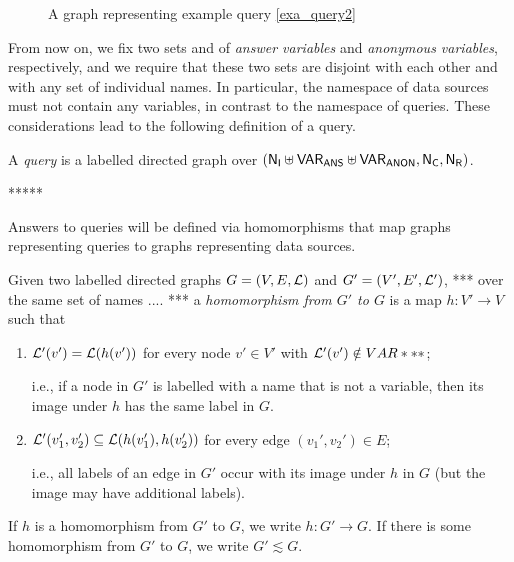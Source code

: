 \begin{figure}
  \caption{A graph representing example query \ref{exa_query2}}
  \label{fig:graph_for_exa_query2}
\end{figure}

From now on, we fix two sets \VARANS and \VARANON
of \emph{answer variables} and \emph{anonymous variables}, respectively,
and we require that these two sets are disjoint with each other
and with any set \NI of individual names.
In particular, the namespace of data sources must not contain any variables,
in contrast to the namespace of queries.
These considerations lead to the following definition of a query.

\begin{definition}
  A \emph{query} is a labelled directed graph
  over $(\mathsf{N}_\mathsf{I} \uplus \mathsf{VAR}_\mathsf{ANS} \uplus \mathsf{VAR}_\mathsf{ANON}, \mathsf{N}_\mathsf{C}, \mathsf{N}_\mathsf{R})$.
\end{definition}



*****


Answers to queries will be defined via homomorphisms that map graphs representing queries
to graphs representing data sources.
%
\begin{definition}
  Given two labelled directed graphs $G = (V,E,\mathcal{L})$ and $G' = (V',E',\mathcal{L}')$,
  *** over the same set of names .... ***
  a \emph{homomorphism from $G'$ to $G$} is a map $h : V' \to V$ such that
  \begin{enumerate}
    \item
      $\mathcal{L}'(v') = \mathcal{L}(h(v'))$ for every node $v' \in V'$ with $\mathcal{L}'(v') \notin VAR***$;
      
      i.e., if a node in $G'$ is labelled with a name that is not a variable,
      then its image under $h$ has the same label in $G$.
    \item
      $\mathcal{L}'(v_1', v_2') \subseteq \mathcal{L}(h(v_1'), h(v_2'))$
      for every edge $(v_1',v_2') \in E$;
      
      i.e., all labels of an edge in $G'$ occur with its image under $h$ in $G$
      (but the image may have additional labels).
  \end{enumerate}
  If $h$ is a homomorphism from $G'$ to $G$, we write $h : G' \to G$.
  If there is some homomorphism from $G'$ to $G$, we write $G' \lesssim G$.
\end{definition}

